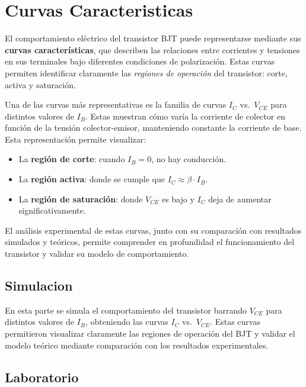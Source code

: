 \chapter{Curvas Caracteristicas}
    El comportamiento eléctrico del transistor BJT puede representarse mediante sus \textbf{curvas características}, que describen las relaciones entre corrientes y tensiones en sus terminales bajo diferentes condiciones de polarización. Estas curvas permiten identificar claramente las \textit{regiones de operación} del transistor: corte, activa y saturación.
    
    Una de las curvas más representativas es la familia de curvas $I_C$ vs.\ $V_{CE}$ para distintos valores de $I_B$. Estas muestran cómo varía la corriente de colector en función de la tensión colector-emisor, manteniendo constante la corriente de base. Esta representación permite visualizar:
    
    \begin{itemize}
        \item La \textbf{región de corte}: cuando $I_B = 0$, no hay conducción.
        \item La \textbf{región activa}: donde se cumple que $I_C \approx \beta \cdot I_B$.
        \item La \textbf{región de saturación}: donde $V_{CE}$ es bajo y $I_C$ deja de aumentar significativamente.
    \end{itemize}
    
    El análisis experimental de estas curvas, junto con su comparación con resultados simulados y teóricos, permite comprender en profundidad el funcionamiento del transistor y validar su modelo de comportamiento.
\newpage

  \section{Simulacion}
  
    En esta parte se simula el comportamiento del transistor barrando $V_{CE}$ para distintos valores de $I_B$, obteniendo las curvas $I_C$ vs.\ $V_{CE}$. Estas curvas permitieron visualizar claramente las regiones de operación del BJT y validar el modelo teórico mediante comparación con los resultados experimentales.

    
\newpage

  \section{Laboratorio}

